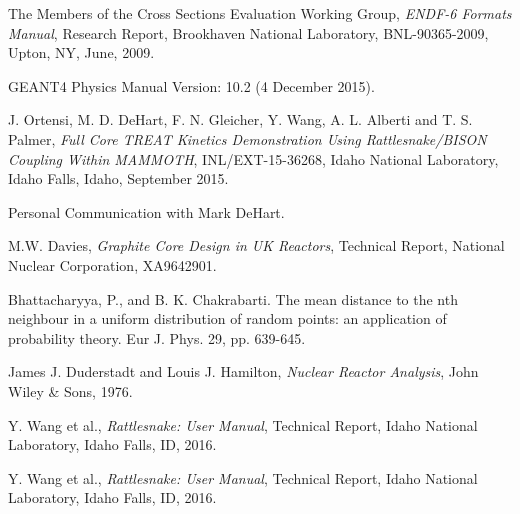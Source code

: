 \documentclass{anstrans}
\begin{document}
\begin{thebibliography}{1}
 The Members of the Cross Sections Evaluation Working Group, {\em ENDF-6 Formats Manual}, Research Report, Brookhaven National Laboratory,
BNL-90365-2009, Upton, NY, June, 2009.

 GEANT4 Physics Manual Version: 10.2 (4 December 2015).

 J. Ortensi, M. D. DeHart, F. N. Gleicher, Y. Wang, A. L. Alberti and T. S. Palmer, {\em Full Core TREAT Kinetics Demonstration Using Rattlesnake/BISON Coupling Within MAMMOTH}, INL/EXT-15-36268, Idaho National Laboratory, Idaho Falls, Idaho, September 2015.

 Personal Communication with Mark DeHart.

 M.W. Davies, {\em Graphite Core Design in UK Reactors}, Technical Report, National Nuclear Corporation, XA9642901.

 Bhattacharyya, P., and B. K. Chakrabarti. The mean distance to the nth neighbour in a uniform distribution of random points: an application of probability theory. Eur J. Phys. 29, pp. 639-645.

 James J. Duderstadt and Louis J. Hamilton, {\em Nuclear Reactor Analysis}, John Wiley \& Sons, 1976.

 Y. Wang et al., {\em Rattlesnake: User Manual}, Technical Report, Idaho National Laboratory, Idaho Falls, ID, 2016.

 Y. Wang et al., {\em Rattlesnake: User Manual}, Technical Report, Idaho National Laboratory, Idaho Falls, ID, 2016.

\end{thebibliography}
\end{document}
